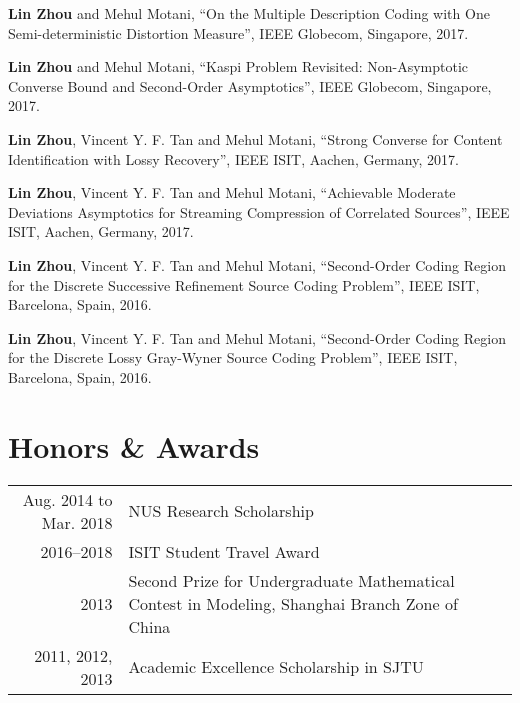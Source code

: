 \documentclass[12pt]{article} %
\begin{document}
\begin{etaremune}
\item \textbf{Lin Zhou} and Mehul Motani, ``On the Multiple Description Coding with One Semi-deterministic Distortion Measure'', IEEE Globecom, Singapore, 2017.
\item \textbf{Lin Zhou} and Mehul Motani,  ``Kaspi Problem Revisited: Non-Asymptotic Converse Bound and Second-Order Asymptotics'', IEEE Globecom, Singapore, 2017.
\item \textbf{Lin Zhou}, Vincent Y. F. Tan and Mehul Motani,  ``Strong Converse for Content Identification with Lossy Recovery'', IEEE ISIT, Aachen, Germany, 2017.
\item \textbf{Lin Zhou}, Vincent Y. F. Tan and Mehul Motani, ``Achievable Moderate Deviations Asymptotics for Streaming Compression of Correlated Sources'', IEEE ISIT, Aachen, Germany, 2017.
\item \textbf{Lin Zhou}, Vincent Y. F. Tan and Mehul Motani,  ``Second-Order Coding Region for the Discrete Successive Refinement Source Coding Problem'', IEEE ISIT, Barcelona, Spain, 2016.
\item \textbf{Lin Zhou}, Vincent Y. F. Tan and Mehul Motani, ``Second-Order Coding Region for the Discrete Lossy Gray-Wyner Source Coding Problem'', IEEE ISIT, Barcelona, Spain, 2016.
\end{etaremune}



\section{Honors \& Awards}
\begin{tabular}{rp{10cm}}
Aug. 2014 to Mar. 2018 & NUS Research Scholarship\\
2016--2018 &ISIT Student Travel Award\\
2013 &Second Prize for Undergraduate Mathematical Contest in Modeling, Shanghai Branch Zone of China \\
2011, 2012, 2013 & Academic Excellence Scholarship in SJTU
\end{tabular}
\end{document}
